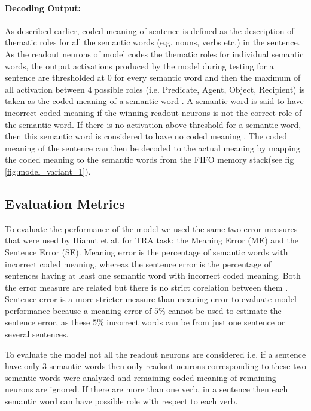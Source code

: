 \paragraph{Decoding Output: } As described earlier, coded meaning of sentence is defined as the description of thematic roles for all the semantic words (e.g. nouns, verbs etc.) in the sentence. As the readout neurons of model codes the thematic roles for individual semantic words, the output activations produced by the model during testing for a sentence are thresholded at 0 for every semantic word and then the maximum of all activation between 4 possible roles (i.e. Predicate, Agent, Object, Recipient) is taken as the coded meaning of a semantic word \cite{xavier:2013:RT}. A semantic word is said to have incorrect coded meaning if the winning readout neurons is not the correct role of the semantic word. If there is no activation above threshold for a semantic word, then this semantic word is considered to have no coded meaning \cite{xavier:2013:RT}. The coded meaning of the sentence can then be decoded to the actual meaning by mapping the coded meaning to the semantic words from the FIFO memory stack(see fig \ref{fig:model_variant_1}).
 

\subsection{Evaluation Metrics}\label{sec:evaluation_metrics_1}

To evaluate the performance of the model we used the same two error measures that were used by Hianut et al.\cite{xavier:2013:RT} for TRA task: the Meaning Error (ME) and the Sentence Error (SE). Meaning error is the percentage of semantic words with incorrect coded meaning, whereas the sentence error is the percentage of sentences having at least one semantic word with incorrect coded meaning. Both the error measure are related but there is no strict corelation between them \cite{xavier:2013:RT}. Sentence error is a more stricter measure than meaning error to evaluate model performance because a meaning error of $5\%$ cannot be used to estimate the sentence error, as these $5\%$ incorrect words can be from just one sentence or several sentences. 

To evaluate the model not all the readout neurons are considered i.e. if a sentence have only 3 semantic words then only readout neurons corresponding to these two semantic words were analyzed \cite{xavier:2013:RT} and remaining coded meaning of remaining neurons are ignored. If there are more than one verb, in a sentence then each semantic word can have possible role with respect to each verb. 

